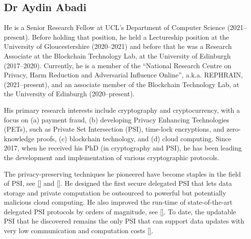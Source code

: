 \subsection{Dr Aydin Abadi}


He is a Senior Research Fellow at UCL’s Department of Computer Science (2021--present). Before holding that position, he held a Lectureship position at the University of Gloucestershire (2020--2021) and before that he was a Research Associate at the Blockchain Technology Lab, at the University of Edinburgh (2017--2020). Currently, he is a member of the ``National Research Centre on Privacy, Harm Reduction and Adversarial Influence Online'', a.k.a. REPHRAIN, (2021--present), and an associate member of the Blockchain Technology Lab, at the University of Edinburgh (2020--present).

His primary research interests include cryptography and cryptocurrency, with a focus on (a) payment fraud, (b) developing Privacy Enhancing Technologies (PETs), such as Private Set Intersection (PSI), time-lock encryptions, and zero-knowledge proofs, (c) blockchain technology, and (d) cloud computing. Since 2017, when he received his PhD (in cryptography and PSI), he has been leading the development and implementation of various cryptographic protocols. 

The privacy-preserving techniques he pioneered have become staples in the field of PSI, see \href{https://link.springer.com/chapter/10.1007/978-3-319-18467-8_1}{[\printcntr]} and \href{https://link.springer.com/chapter/10.1007/978-3-662-54970-4_9}{[\printcntr]}. He designed the first secure delegated PSI that lets data storage and private computation be outsourced to powerful but potentially malicious cloud computing. He also improved the run-time of state-of-the-art delegated PSI protocols by orders of magnitude, see \href{https://ieeexplore.ieee.org/document/7934388}{[\printcntr]}. To date, the updatable PSI that he discovered remains the only PSI that can support data updates with very low communication and computation costs \href{https://link.springer.com/chapter/10.1007/978-3-031-18283-9_6}{[\printcntr]}.  


